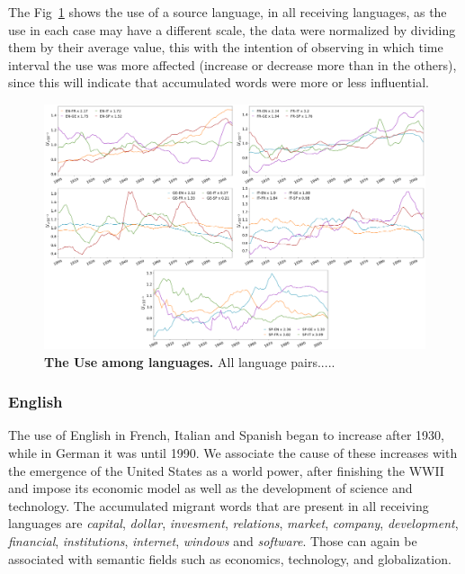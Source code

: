 \documentclass[10pt,letterpaper]{article} %
\begin{document}
The Fig~\ref{fig.UT_art} shows the use of a source language, in all receiving languages, as the use in each case may have a different scale, the data were normalized by dividing them by their average value, this with the intention of observing in which time interval the use was more affected (increase or decrease more than in the others), since this will indicate that accumulated words were more or less influential. 


\begin{figure}[!h]
	\begin{adjustwidth}{-6cm}{1cm}
		\centering
		\includegraphics[scale=0.28]{UT_2.png}
		\caption{{\bf The Use among languages.} All language pairs.....}
		\label{fig.UT_art}
	\end{adjustwidth}
\end{figure}
\subsubsection*{English} %

The use of English in French, Italian and Spanish began to increase after 1930, while in German it was until 1990. We associate the cause of these increases with the emergence of the United States as a world power, after finishing the WWII and  impose its economic model as well as the development of science and technology. The accumulated migrant words that are present in all receiving  languages ​are \textit{capital}, \textit{dollar}, \textit{invesment}, \textit{relations}, \textit{market}, \textit{company}, \textit{development}, \textit{financial},  \textit{institutions}, \textit{internet}, \textit{windows} and \textit{software}. Those can again be associated with semantic fields such as economics, technology, and globalization.
\end{document}

